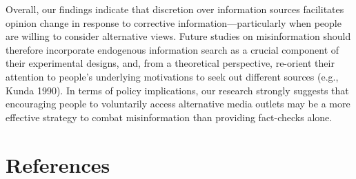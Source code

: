 \documentclass[
  12pt,
]{article}
\begin{document}
Overall, our findings indicate that discretion over information sources
facilitates opinion change in response to corrective
information---particularly when people are willing to consider
alternative views. Future studies on misinformation should therefore
incorporate endogenous information search as a crucial component of
their experimental designs, and, from a theoretical perspective,
re-orient their attention to people's underlying motivations to seek out
different sources (e.g., Kunda 1990). In terms of policy implications,
our research strongly suggests that encouraging people to voluntarily
access alternative media outlets may be a more effective strategy to
combat misinformation than providing fact-checks alone.

\clearpage
\parskip=10pt
\singlespace

\hypertarget{bibliography}{%
\section*{References}\label{bibliography}}
\end{document}
